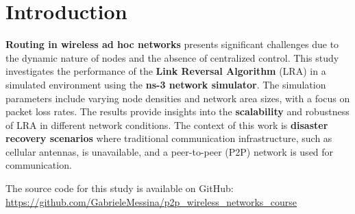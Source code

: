 \documentclass[../report.tex]{subfiles}
\begin{document}
\section{Introduction}
\textbf{Routing in wireless ad hoc networks} presents significant challenges due to the dynamic nature of nodes and the absence of centralized control. This study investigates the performance of the \textbf{Link Reversal Algorithm} (LRA\cite{gafni1981distributed}) in a simulated environment using the\textbf{ ns-3 network simulator}. The simulation parameters include varying node densities and network area sizes, with a focus on packet loss rates. The results provide insights into the \textbf{scalability} and robustness of LRA in different network conditions. The context of this work is \textbf{disaster recovery scenarios} where traditional communication infrastructure, such as cellular antennas, is unavailable, and a peer-to-peer (P2P) network is used for communication.


The source code for this study is available on GitHub: \url{https://github.com/GabrieleMessina/p2p_wireless_networks_course}
\end{document}
